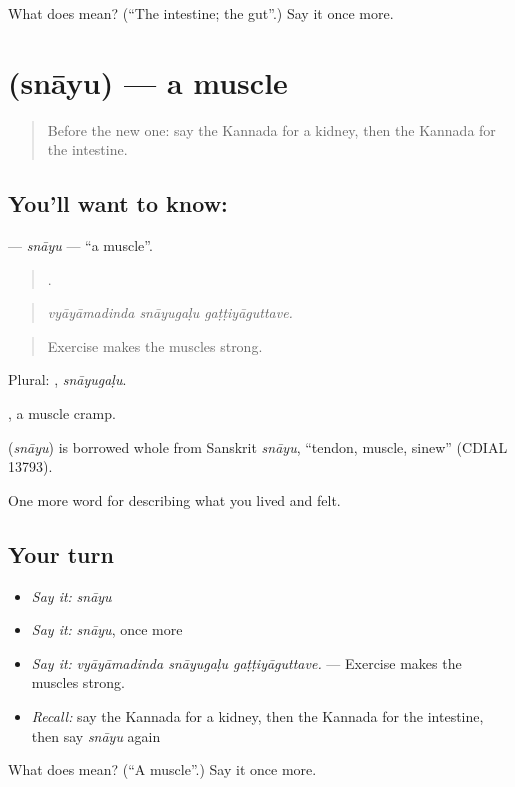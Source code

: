 \begin{tcolorbox}[breakable,colback=teal!4,colframe=teal!35!black,title={Before you move on}]
What does  mean? (\textquotedblleft{}The intestine; the gut\textquotedblright{}.) Say it once more.
\end{tcolorbox}
\section[\texorpdfstring{\kn{ಸ್ನಾಯು} (snāyu)}{ಸ್ನಾಯು (snāyu)}]{ (snāyu) — a muscle}

\label{lesson:KA-C508-snayu}



\begin{quote}
Before the new one: say the Kannada for a kidney, then the Kannada for the intestine.
\end{quote}

\subsection*{You'll want to know: }
\textbf{} — \emph{snāyu} — \textquotedblleft{}a muscle\textquotedblright{}.

\begin{quote}
  .
\end{quote}

\begin{quote}
\emph{vyāyāmadinda snāyugaḷu gaṭṭiyāguttave.}
\end{quote}

\begin{quote}
Exercise makes the muscles strong.
\end{quote}

Plural: , \emph{snāyugaḷu}.

 , a muscle cramp.

\begin{cousinweb}
\textbf{} (\emph{snāyu}) is borrowed whole from Sanskrit \emph{snāyu}, \textquotedblleft{}tendon, muscle, sinew\textquotedblright{} (CDIAL 13793).
\end{cousinweb}

\begin{grammarlens}[title={What you've built}]
One more word for describing what you lived and felt.
\end{grammarlens}

\subsection*{Your turn}
\begin{itemize}
\raggedright
  \item \emph{Say it:} \emph{snāyu}
  \item \emph{Say it:} \emph{snāyu}, once more
  \item \emph{Say it:} \emph{vyāyāmadinda snāyugaḷu gaṭṭiyāguttave.} — Exercise makes the muscles strong.
  \item \emph{Recall:} say the Kannada for a kidney, then the Kannada for the intestine, then say \emph{snāyu} again
\end{itemize}

\begin{tcolorbox}[breakable,colback=teal!4,colframe=teal!35!black,title={Before you move on}]
What does  mean? (\textquotedblleft{}A muscle\textquotedblright{}.) Say it once more.
\end{tcolorbox}
